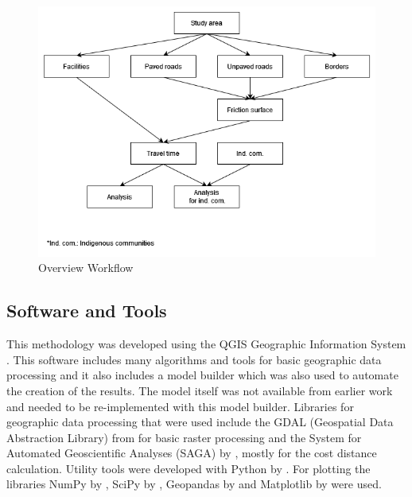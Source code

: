 \documentclass[11pt, a4paper]{report}
\begin{document}
\begin{figure}[H]
  \centering
  \includegraphics[width=0.9\linewidth]{figures/overviewworkflow.png}
  \caption{Overview Workflow}
  \label{fig:overviewworkflow}
\end{figure}

\subsection{Software and Tools}
This methodology was developed using the QGIS Geographic Information System \citep{qgis_development_team_qgis_2024}. This software includes many algorithms and tools for basic geographic data processing and it also includes a model builder which was also used to automate the creation of the results. The model itself was not available from earlier work and needed to be re-implemented with this model builder. Libraries for geographic data processing that were used include the GDAL (Geospatial Data Abstraction Library) from \citet{rouault_gdal_2024} for basic raster processing and the System for Automated Geoscientific Analyses (SAGA) by \citet{conrad_system_2015}, mostly for the cost distance calculation. Utility tools were developed with Python by \citet{python_software_foundation_python_2024}. For plotting the libraries NumPy by \citet{harris_array_2020}, SciPy by \citet{virtanen_scipy_2020}, Geopandas by \citet{jordahl_geopandasgeopandas_2020} and Matplotlib by \citet{hunter_matplotlib_2007} were used.
\end{document}
